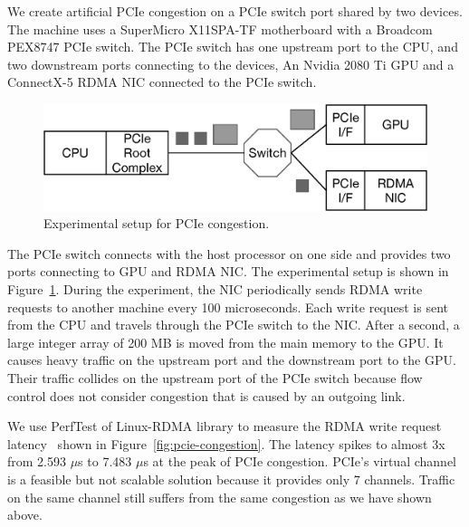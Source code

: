 We create artificial PCIe congestion on a PCIe switch port shared by two devices. The machine uses a SuperMicro X11SPA-TF motherboard with a Broadcom PEX8747 PCIe switch. The PCIe switch has one upstream port to the CPU, and two downstream ports connecting to the devices, An Nvidia 2080 Ti GPU and a ConnectX-5 RDMA NIC connected to the PCIe switch.
%
\begin{figure}[ht!]  
    \centering
    \includegraphics[width=0.8\columnwidth]{figure/aurelia/pcie-exp.eps}  
    \caption{Experimental setup for PCIe congestion.}
    \label{fig:pcie-experiment}        
\end{figure}
%
The PCIe switch connects with the host processor on one side and provides two ports connecting to GPU and RDMA NIC.
%
The experimental setup is shown in Figure~\ref{fig:pcie-experiment}.
%
During the experiment, the NIC periodically sends RDMA write requests to another machine every 100 microseconds. 
%
Each write request is sent from the CPU and travels through the PCIe switch to the NIC. 
%
After a second, a large integer array of 200 MB is moved from the main memory to the GPU. It causes heavy traffic on the upstream port and the downstream port to the GPU.
%
Their traffic collides on the upstream port of the PCIe switch %
because flow control does not consider congestion that is caused by an outgoing link. 

We use PerfTest of Linux-RDMA library to measure the RDMA write request latency~\cite{ofed-perftest} shown in Figure~\ref{fig:pcie-congestion}. The latency spikes to almost 3x from 2.593 $\mu$s to 7.483 $\mu$s at the peak of PCIe congestion. 
%
PCIe's virtual channel is a feasible but not scalable solution because it provides only 7 channels. 
%
Traffic on the same channel still suffers from the same congestion as we have shown above. 
 

